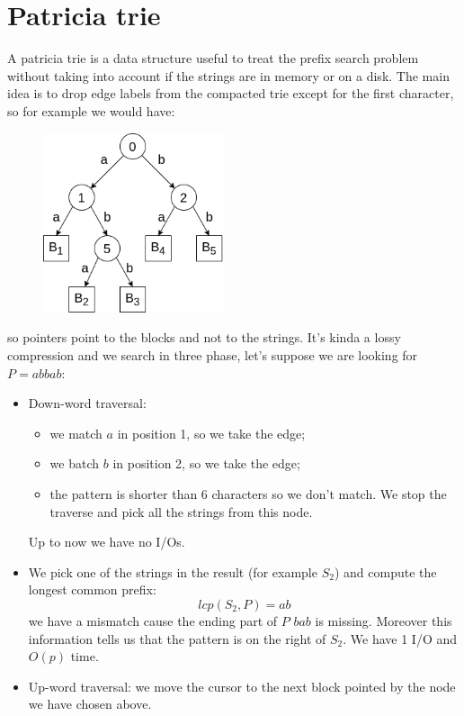 \section{Patricia trie}
A patricia trie is a data structure useful to treat the prefix search problem without taking into account if the strings are in memory or on a disk.
The main idea is to drop edge labels from the compacted trie except for the first character, so for example we would have:
\begin{figure}[H]
    \centering
    \includegraphics[width=200px]{images/8_Prefix_search/patricia_trie.png}
\end{figure}
so pointers point to the blocks and not to the strings.
It's kinda a lossy compression and we search in three phase, let's suppose we are looking for $P=abbab$:
\begin{itemize}
    \item Down-word traversal:
    \begin{itemize}
        \item we match $a$ in position 1, so we take the edge;
        \item we batch $b$ in position 2, so we take the edge;
        \item the pattern is shorter than 6 characters so we don't match. We stop the traverse and pick all the strings from this node.
    \end{itemize}
    Up to now we have no I/Os.

    \item We pick one of the strings in the result (for example $S_2$) and compute the longest common prefix:
    $$
        lcp(S_2, P) = ab
    $$
    we have a mismatch cause the ending part of $P$ $bab$ is missing.
    Moreover this information tells us that the pattern is on the right of $S_2$.
    We have 1 I/O and $O(p)$ time.

    \item Up-word traversal: we move the cursor to the next block pointed by the node we have chosen above.
\end{itemize}


